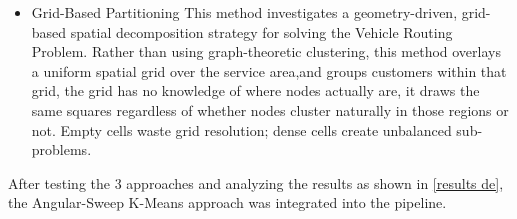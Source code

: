 \documentclass[a4paper]{report}
\begin{document}
{\begin{itemize}
\begin{enumerate}
\begin{itemize}
\begin{itemize}
            \item $d_{\text{spatial}}(i, j)$: the Euclidean distance between nodes $i$ and $j$ 
            in the geographic coordinate space, capturing spatial proximity.
        
            \item $d_{\text{depot}}(i)$: the Euclidean distance from node $i$ to the depot (node 0), 
            representing how far into the service area node $i$ lies.
        
            \item $\left| d_{\text{depot}}(i) - d_{\text{depot}}(j) \right|$: the absolute difference 
            in depot distances between nodes $i$ and $j$, penalizing clusters that mix 
            near-depot and far-depot nodes within the same route.
        
            \item $0.7$: weight assigned to spatial compactness, prioritizing geographic 
            proximity as the primary clustering criterion.
        
            \item $0.3$: weight assigned to depot-distance homogeneity, encouraging each 
            cluster to serve a consistent depth zone relative to the depot.
        \end{itemize}
        
        So, the depot topology isn't treated as pairwise node distance only, but also as a signal for clustering.
        
        \item Grid-Based Partitioning \newline
        This method investigates a geometry-driven, grid-based spatial decomposition strategy for solving the Vehicle Routing Problem. Rather than using graph-theoretic clustering, this method overlays a uniform spatial grid over the service area,and groups customers within that grid, the grid has no knowledge of where nodes actually are, it draws the same squares regardless of whether nodes cluster naturally in those regions or not. Empty cells waste grid resolution; dense cells create unbalanced sub-problems.
        
        
    \end{itemize}
    
\end{enumerate}
  After testing the 3 approaches and analyzing the results as shown in \ref{results de}, the  Angular-Sweep K-Means approach was integrated into the pipeline. 






\end{itemize}}
\end{document}
